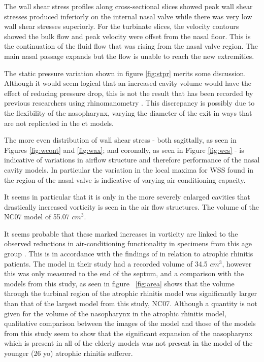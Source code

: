 The wall shear stress profiles along cross-sectional slices showed peak wall shear stresses produced inferiorly on the internal nasal valve while there was very low wall shear stresses superiorly. For the turbinate slices, the velocity contours showed the bulk flow and peak velocity were offset from the nasal floor. This is the continuation of the fluid flow that was rising from the nasal valve region. The main nasal passage expands but the flow is unable to reach the new extremities.

The static pressure variation shown in figure \ref{fig:stpr} merits some discussion. Although it would seem logical that an increased cavity volume would have the effect of reducing pressure drop, this is not the result that has been recorded by previous researchers using rhinomanometry \cite{Lindemann2008}. This discrepancy is possibly due to the flexibility of the nasopharynx, varying the diameter of the exit in ways that are not replicated in the ct models.

The more even distribution of wall shear stress - both sagittally, as seen in Figures \ref{fig:wcont} and \ref{fig:wax}; and coronally, as seen in Figure \ref{fig:wcs} - is indicative of variations in airflow structure and therefore performance of the nasal cavity models. In particular the variation in the local maxima for WSS found in the region of the nasal valve is indicative of varying air conditioning capacity.

It seems in particular that it is only in the more severely enlarged cavities that drastically increased vorticity is seen in the air flow structures. The volume of the NC07 model of 55.07 $cm^3$.

It seems probable that these marked increases in vorticity are linked to the observed reductions in air-conditioning functionality in specimens from this age group \cite{Lindemann2009a}. This is in accordance with the findings of \cite{Garcia2007} in relation to atrophic rhinitis patients. The model in their study had a recorded volume of 34.5 $cm^3$, however this was only measured to the end of the septum, and a comparison with the models from this study, as seen in figure ~\ref{fig:area} shows that the volume through the turbinal region of the atrophic rhinitis model was significantly larger than that of the largest model from this study, NC07. Although a quantity is not given for the volume of the nasopharynx in the atrophic rhinitis model, qualitative comparison between the  images of the model and those of the models from this study seem to show that the significant expansion of the nasopharynx which is present in all of the elderly models was not present in the model of the younger (26 yo) atrophic rhinitis sufferer. 

